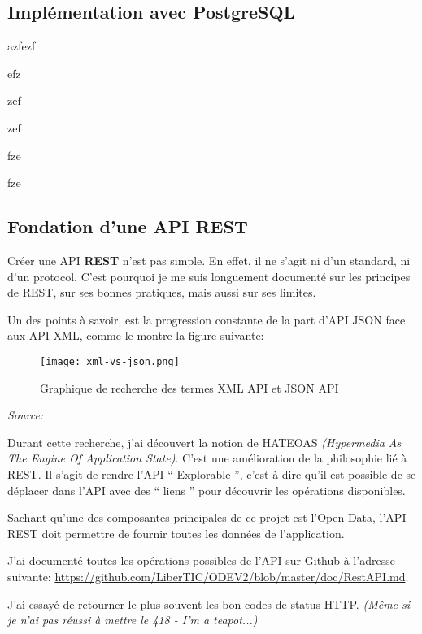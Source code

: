\subsection{Implémentation avec PostgreSQL}

azfezf

efz

zef

zef


fze

fze

\subsection{Fondation d'une API REST}

Créer une API \textbf{REST} n'est pas simple. En effet, il ne s'agit ni d'un standard, ni d'un protocol. C'est pourquoi je me suis longuement documenté sur les principes de REST, sur ses bonnes pratiques, mais aussi sur ses limites. 

Un des points à savoir, est la progression constante de la part d'API JSON face aux API XML, comme le montre la figure suivante:

\begin{figure}[h]
\begin{center}
\texttt{[image: xml-vs-json.png]}
\end{center}
\caption{Graphique de recherche des termes XML API et JSON API}
\end{figure}

\newpage

\textit{Source: }

Durant cette recherche, j'ai découvert la notion de HATEOAS \textit{(Hypermedia As The Engine Of Application State)}. C'est une amélioration de la philosophie lié à REST. Il s'agit de rendre l'API `` Explorable '', c'est à dire qu'il est possible de se déplacer dans l'API avec des `` liens '' pour découvrir les opérations disponibles.

Sachant qu'une des composantes principales de ce projet est l'Open Data, l'API REST doit permettre de fournir toutes les données de l'application.

J'ai documenté toutes les opérations possibles de l'API sur Github à l'adresse suivante: \url{https://github.com/LiberTIC/ODEV2/blob/master/doc/RestAPI.md}.

J'ai essayé de retourner le plus souvent les bon codes de status HTTP. \textit{(Même si je n'ai pas réussi à mettre le 418 - I'm a teapot...)}

